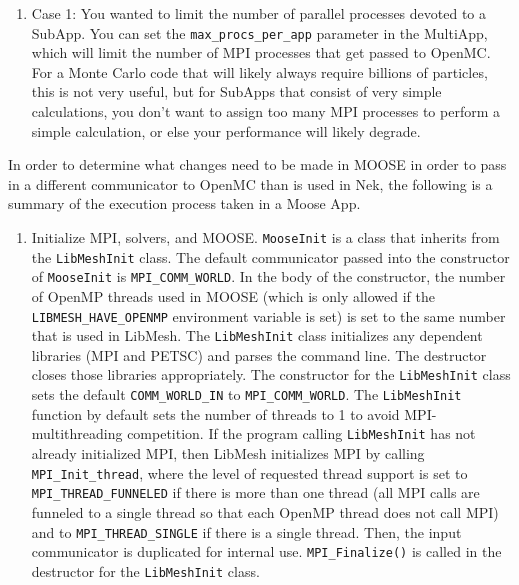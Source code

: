 \documentclass[10pt]{article}
\numberwithin{equation}{section} %
\begin{document}
\begin{enumerate}
\item Case 1: You wanted to limit the number of parallel processes devoted to a SubApp. You can set the {\tt max\_procs\_per\_app} parameter in the MultiApp, which will limit the number of MPI processes that get passed to OpenMC. For a Monte Carlo code that will likely always require billions of particles, this is not very useful, but for SubApps that consist of very simple calculations, you don't want to assign too many MPI processes to perform a simple calculation, or else your performance will likely degrade.
\end{enumerate} 

In order to determine what changes need to be made in MOOSE in order to pass in a different communicator to OpenMC than is used in Nek, the following is a summary of the execution process taken in a Moose App. 

\begin{enumerate}
\item Initialize MPI, solvers, and MOOSE. {\tt MooseInit} is a class that inherits from the {\tt LibMeshInit} class. The default communicator passed into the constructor of {\tt MooseInit} is {\tt MPI\_COMM\_WORLD}. In the body of the constructor, the number of OpenMP threads used in MOOSE (which is only allowed if the {\tt LIBMESH\_HAVE\_OPENMP} environment variable is set) is set to the same number that is used in LibMesh. The {\tt LibMeshInit} class initializes any dependent libraries (MPI and PETSC) and parses the command line. The destructor closes those libraries appropriately. The constructor for the {\tt LibMeshInit} class sets the default {\tt COMM\_WORLD\_IN} to {\tt MPI\_COMM\_WORLD}. The {\tt LibMeshInit} function by default sets the number of threads to 1 to avoid MPI-multithreading competition. If the program calling {\tt LibMeshInit} has not already initialized MPI, then LibMesh initializes MPI by calling {\tt MPI\_Init\_thread}, where the level of requested thread support is set to {\tt MPI\_THREAD\_FUNNELED} if there is more than one thread (all MPI calls are funneled to a single thread so that each OpenMP thread does not call MPI) and to {\tt MPI\_THREAD\_SINGLE} if there is a single thread. Then, the input communicator is duplicated for internal use. {\tt MPI\_Finalize()} is called in the destructor for the {\tt LibMeshInit} class. 
\end{enumerate}
\end{document}
